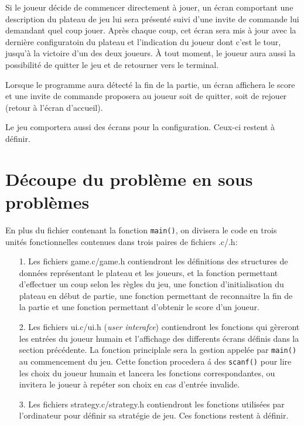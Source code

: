 \documentclass{article}
\newcommand{\cscript}[2]{
\begin{itemize}
\item[]
\end{itemize}
}
\begin{document}
\cscript{welcome}{\'Ecran d'accueil}

Si le joueur d\'ecide de commencer directement \`a jouer, un \'ecran comportant une description du plateau de jeu lui sera pr\'esent\'e suivi d'une invite de commande lui demandant quel coup jouer. Apr\`es chaque coup, cet \'ecran sera mis \`a jour avec la derni\`ere configuratoin du plateau et l'indication du joueur dont c'est le tour, jusqu'\`a la victoire d'un des deux joueurs. \`A tout moment, le joueur aura aussi la possibilit\'e de quitter le jeu et de retourner vers le terminal.

\cscript{game}{\'Ecran de jeu}

Lorsque le programme aura d\'etect\'e la fin de la partie, un \'ecran affichera le score et une invite de commande proposera au joueur soit de quitter, soit de rejouer (retour \`a l'\'ecran d'accueil).

\cscript{endgame}{\'Ecran de fin de partie}

Le jeu comportera aussi des \'ecrans pour la configuration. Ceux-ci restent \`a d\'efinir.

\section{D\'ecoupe du probl\`eme en sous probl\`emes}

En plus du fichier contenant la fonction \texttt{main()}, on divisera le code en trois unit\'es fonctionnelles contenues dans trois paires de fichiers .c/.h:

\begin{enumerate}

\item[1.]
Les fichiers game.c/game.h contiendront les d\'efinitions des structures de donn\'ees repr\'esentant le plateau et les joueurs, et la fonction permettant d'effectuer un coup selon les r\`egles du jeu, une fonction d'initialisation du plateau en d\'ebut de partie, une fonction permettant de reconnaitre la fin de la partie et une fonction permettant d'obtenir le score d'un joueur.

\item[2.]
Les fichiers ui.c/ui.h (\textit{user interafce}) contiendront les fonctions qui g\`ereront les entr\'ees du joueur humain et l'affichage des differents \'ecrans d\'efinis dans la section pr\'ec\'edente.
La fonction principlale sera la gestion appel\'ee par \texttt{main()} au commencement du jeu. Cette fonction procedera \'a des \texttt{scanf()} pour lire les choix du joueur humain et lancera les fonctions correspondantes, ou invitera le joueur \`a rep\'eter son choix en cas d'entr\'ee invalide. 

\item[3.]
Les fichiers strategy.c/strategy.h contiendront les fonctions utilis\'ees par l'ordinateur pour d\'efinir sa strat\'egie de jeu. Ces fonctions restent \`a d\'efinir.

\end{enumerate}
\end{document}

